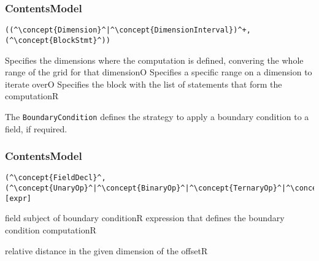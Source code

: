 \subsubsection*{ContentsModel}{}

\begin{lstlisting}[style=default]
((^\concept{Dimension}^|^\concept{DimensionInterval})^+,(^\concept{BlockStmt}^))
\end{lstlisting}

\begin{HIRChildElements}
	{Specifies the dimensions where the computation is defined, 
		convering the whole range of the grid for that dimension}{O}
	{Specifies a specific range on a dimension to iterate over}{O}
	{Specifies the block with the list of statements that form the computation}{R}
\end{HIRChildElements}


The {\tt BoundaryCondition} defines the strategy to apply a boundary condition to a field, if required.

\subsubsection*{ContentsModel}{}

\begin{lstlisting}[style=default]
(^\concept{FieldDecl}^, (^\concept{UnaryOp}^|^\concept{BinaryOp}^|^\concept{TernaryOp}^|^\concept{FieldAccess}^|^\concept{VarAccess}^|^\concept{Literal}^)[expr]
\end{lstlisting}

\begin{HIRChildElements}
	{field subject of boundary condition}{R}
	{expression that defines the boundary condition computation}{R}
		
\end{HIRChildElements}

\begin{HIRAttributes}
	{relative distance in the given dimension of the offset}{R}
\end{HIRAttributes}
